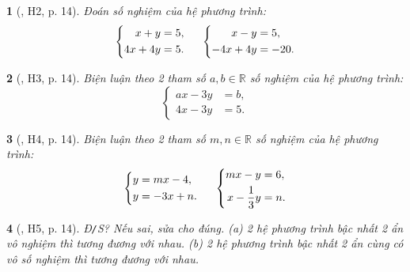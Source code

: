\documentclass{article}
\newtheorem{baitoan}{}
\begin{document}
\begin{baitoan}[\cite{Binh_boi_duong_Toan_9_tap_2}, H2, p. 14]
	Đoán số nghiệm của hệ phương trình:
	\begin{equation*}
		\left\{\begin{split}
			x + y &= 5,\\
			4x + 4y &= 5.
		\end{split}\right.\hspace{5mm}
		\left\{\begin{split}
			x - y &= 5,\\
			-4x + 4y &= -20.
		\end{split}\right.
	\end{equation*}
\end{baitoan}

\begin{baitoan}[\cite{Binh_boi_duong_Toan_9_tap_2}, H3, p. 14]
	Biện luận theo 2 tham số $a,b\in\mathbb{R}$ số nghiệm của hệ phương trình:
	\begin{equation*}
		\left\{\begin{split}
			ax - 3y &= b,\\
			4x - 3y &= 5.
		\end{split}\right.
	\end{equation*}
\end{baitoan}

\begin{baitoan}[\cite{Binh_boi_duong_Toan_9_tap_2}, H4, p. 14]
	Biện luận theo 2 tham số $m,n\in\mathbb{R}$ số nghiệm của hệ phương trình:
	\begin{equation*}
		\left\{\begin{split}
			y &= mx - 4,\\
			y &= -3x + n.
		\end{split}\right.\hspace{5mm}
		\left\{\begin{split}
			mx - y &= 6,\\
			x - \dfrac{1}{3}y &= n.
		\end{split}\right.
	\end{equation*}
\end{baitoan}

\begin{baitoan}[\cite{Binh_boi_duong_Toan_9_tap_2}, H5, p. 14]
	{\rm Đ{\tt/}S?} Nếu sai, sửa cho đúng. (a) 2 hệ phương trình bậc nhất 2 ẩn vô nghiệm thì tương đương với nhau. (b) 2 hệ phương trình bậc nhất 2 ẩn cùng có vô số nghiệm thì tương đương với nhau.
\end{baitoan}
\end{document}
